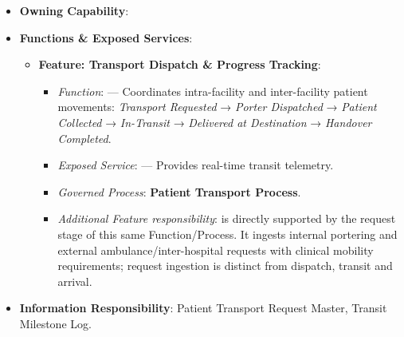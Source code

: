 \begin{itemize}

\item 
\textbf{Owning Capability}: \texttt{}



\item 
\textbf{Functions \& Exposed Services}:


\begin{itemize}

\item 
\textbf{Feature: Transport Dispatch \& Progress Tracking}:


\begin{itemize}

\item 
\emph{Function}: \texttt{} — Coordinates intra-facility and inter-facility patient movements: \emph{Transport Requested} → \emph{Porter Dispatched} → \emph{Patient Collected} → \emph{In-Transit} → \emph{Delivered at Destination} → \emph{Handover Completed}.



\item 
\emph{Exposed Service}: \texttt{} — Provides real-time transit telemetry.



\item 
\emph{Governed Process}: \textbf{Patient Transport Process}.



\item 
\emph{Additional Feature responsibility}: \texttt{} is directly supported by the request stage of this same Function/\allowbreak{}Process. It ingests internal portering and external ambulance/\allowbreak{}inter-hospital requests with clinical mobility requirements; request ingestion is distinct from dispatch, transit and arrival.



\end{itemize}


\end{itemize}


\item 
\textbf{Information Responsibility}: Patient Transport Request Master, Transit Milestone Log.



\end{itemize}
\label{rad:hso:259}

